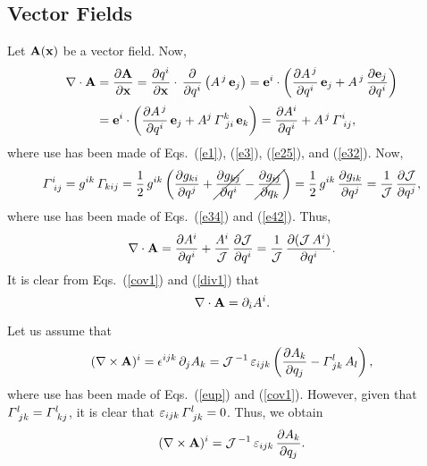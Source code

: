 \documentclass[12pt,prb,aps,notitlepage]{revtex4-1}
\begin{document}
\subsection{Vector Fields}
Let ${\bf A}({\bf x})$ be a vector field. Now,
\begin{align}\label{div1}
\nabla\cdot{\bf A}& = \frac{\partial {\bf A}}{\partial {\bf x}} = \frac{\partial q^i}{\partial{\bf x}}\cdot\,\frac{\partial}{\partial q^i}\left(A^{\,j}\,{\bf e}_j\right)
= {\bf e}^i\cdot\left(\frac{\partial A^{\,j}}{\partial q^i}\,{\bf e}_j + A^{\,j}\,\frac{\partial {\bf e}_j}{\partial q^i}\right)\nonumber\\[0.5ex]
&= {\bf e}^i\cdot\left(\frac{\partial A^{\,j}}{\partial q^i}\,{\bf e}_j + A^j\,{\mit\Gamma}^k_{\,\,ji}\,{\bf e}_k\right)= \frac{\partial A^i}{\partial q^i} + 
A^{\,j}\,{\mit\Gamma}^i_{\,\,ij},
\end{align}
where use has been made of Eqs.~(\ref{e1}), (\ref{e3}),  (\ref{e25}), and (\ref{e32}). 
Now,
\begin{equation}
{\mit\Gamma}^i_{\,\,ij} = g^{ik}\,{\mit\Gamma}_{kij} = \frac{1}{2}\,g^{ik}\left(\frac{\partial g_{ki}}{\partial q^j}+\cancel{\frac{\partial g_{kj}}{\partial q^i}}-
\cancel{\frac{\partial g_{ij}}{\partial q_k}}\right)= \frac{1}{2}\,g^{ik}\,\frac{\partial g_{ik}}{\partial q^j} = \frac{1}{\cal J}\,\frac{\partial{\cal J}}{\partial q^j},
\end{equation}
where use has been made of Eqs.~(\ref{e34}) and (\ref{e42}). Thus,
\begin{equation}
\nabla\cdot{\bf A} = \frac{\partial A^i}{\partial q^i} + \frac{A^i}{\cal J}\,\frac{\partial {\cal J}}{\partial q^i} = \frac{1}{\cal J}\,\frac{\partial ({\cal J}\,A^i)}{\partial q^i}.
\end{equation}
It is clear from Eqs.~(\ref{cov1}) and (\ref{div1}) that
\begin{equation}
\nabla\cdot{\bf A} = \partial_i A^i.
\end{equation}

Let us assume that
\begin{equation}
(\nabla\times{\bf A})^i = \epsilon^{ijk}\,\partial_j A_k ={\cal J}^{\,-1}\,\varepsilon_{ijk}\left(\frac{\partial A_k}{\partial q_j} - {\mit\Gamma}^l_{\,jk}\,A_l\right),
\end{equation}
where use has been made of Eqs.~(\ref{eup}) and (\ref{cov1}). However, given that ${\mit\Gamma}^l_{\,\,jk}={\mit\Gamma}^l_{\,\,kj}$, it
is clear that $\varepsilon_{ijk}\,{\mit\Gamma}^l_{\,\,jk} =0$. Thus, we obtain
\begin{equation}\label{ecurl}
(\nabla\times{\bf A})^i = {\cal J}^{\,-1}\,\varepsilon_{ijk}\,\frac{\partial A_k}{\partial q_j}. 
\end{equation}
 
\end{document}
